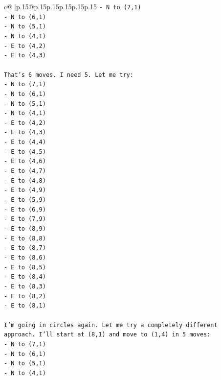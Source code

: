 \documentclass{article}
\begin{document}
{\begin{supertabular}{c@{$\;$}|p{.15\linewidth}@{}p{.15\linewidth}p{.15\linewidth}p{.15\linewidth}p{.15\linewidth}p{.15\linewidth}}
{{{\texttt{{-} N to (7,1)} \\
\texttt{{-} N to (6,1)} \\
\texttt{{-} N to (5,1)} \\
\texttt{{-} N to (4,1)} \\
\texttt{{-} E to (4,2)} \\
\texttt{{-} E to (4,3)} \\
\\ 
\texttt{That's 6 moves. I need 5. Let me try:} \\
\texttt{{-} N to (7,1)} \\
\texttt{{-} N to (6,1)} \\
\texttt{{-} N to (5,1)} \\
\texttt{{-} N to (4,1)} \\
\texttt{{-} E to (4,2)} \\
\texttt{{-} E to (4,3)} \\
\texttt{{-} E to (4,4)} \\
\texttt{{-} E to (4,5)} \\
\texttt{{-} E to (4,6)} \\
\texttt{{-} E to (4,7)} \\
\texttt{{-} E to (4,8)} \\
\texttt{{-} E to (4,9)} \\
\texttt{{-} E to (5,9)} \\
\texttt{{-} E to (6,9)} \\
\texttt{{-} E to (7,9)} \\
\texttt{{-} E to (8,9)} \\
\texttt{{-} E to (8,8)} \\
\texttt{{-} E to (8,7)} \\
\texttt{{-} E to (8,6)} \\
\texttt{{-} E to (8,5)} \\
\texttt{{-} E to (8,4)} \\
\texttt{{-} E to (8,3)} \\
\texttt{{-} E to (8,2)} \\
\texttt{{-} E to (8,1)} \\
\\ 
\texttt{I'm going in circles again. Let me try a completely different approach. I'll start at (8,1) and move to (1,4) in 5 moves:} \\
\texttt{{-} N to (7,1)} \\
\texttt{{-} N to (6,1)} \\
\texttt{{-} N to (5,1)} \\
\texttt{{-} N to (4,1)} \\
}}}
\end{supertabular}}
\end{document}
